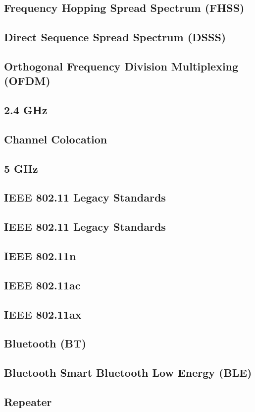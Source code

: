 \documentclass[11pt]{article}
\begin{document}
\subsection{Frequency Hopping Spread Spectrum (FHSS)}
\subsection{Direct Sequence Spread Spectrum (DSSS)}
\subsection{Orthogonal Frequency Division Multiplexing (OFDM)}
\subsection{2.4 GHz}
\subsection{Channel Colocation}
\subsection{5 GHz}
\subsection{IEEE 802.11 Legacy Standards}
\subsection{IEEE 802.11 Legacy Standards}
\subsection{IEEE 802.11n}
\subsection{IEEE 802.11ac}
\subsection{IEEE 802.11ax}
\subsection{Bluetooth (BT)}
\subsection{Bluetooth Smart Bluetooth Low Energy (BLE)}
\subsection{Repeater}
\end{document}
